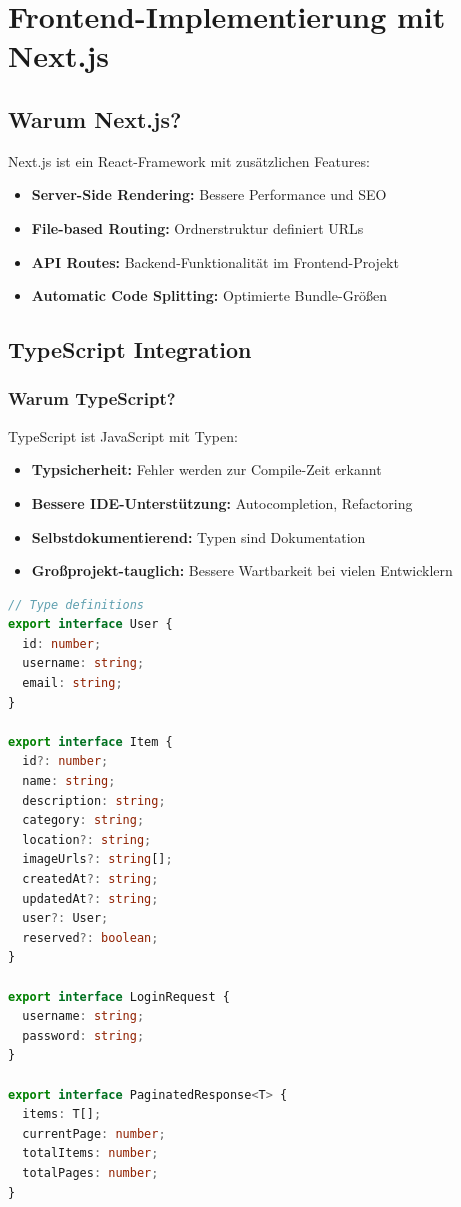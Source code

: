 \documentclass[a4paper,12pt]{article}
\begin{document}
\section{Frontend-Implementierung mit Next.js}

\subsection{Warum Next.js?}

Next.js ist ein React-Framework mit zusätzlichen Features:
\begin{itemize}
    \item \textbf{Server-Side Rendering:} Bessere Performance und SEO
    \item \textbf{File-based Routing:} Ordnerstruktur definiert URLs
    \item \textbf{API Routes:} Backend-Funktionalität im Frontend-Projekt
    \item \textbf{Automatic Code Splitting:} Optimierte Bundle-Größen
\end{itemize}

\subsection{TypeScript Integration}

\subsubsection{Warum TypeScript?}

TypeScript ist JavaScript mit Typen:
\begin{itemize}
    \item \textbf{Typsicherheit:} Fehler werden zur Compile-Zeit erkannt
    \item \textbf{Bessere IDE-Unterstützung:} Autocompletion, Refactoring
    \item \textbf{Selbstdokumentierend:} Typen sind Dokumentation
    \item \textbf{Großprojekt-tauglich:} Bessere Wartbarkeit bei vielen Entwicklern
\end{itemize}

\begin{lstlisting}[language=TypeScript, caption=api.ts - TypeScript-Interfaces]
// Type definitions
export interface User {
  id: number;
  username: string;
  email: string;
}

export interface Item {
  id?: number;
  name: string;
  description: string;
  category: string;
  location?: string;
  imageUrls?: string[];
  createdAt?: string;
  updatedAt?: string;
  user?: User;
  reserved?: boolean;
}

export interface LoginRequest {
  username: string;
  password: string;
}

export interface PaginatedResponse<T> {
  items: T[];
  currentPage: number;
  totalItems: number;
  totalPages: number;
}
\end{lstlisting}
\end{document}
